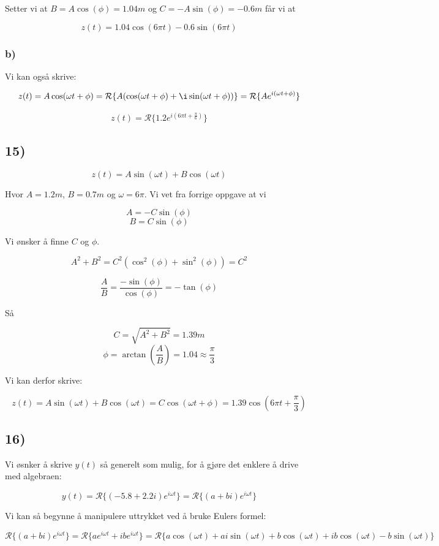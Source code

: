 \documentclass[a4paper,norsk, 10pt]{article}
\begin{document}
Setter vi at $B = A\cos(\phi) = 1.04m$ og $C = -A\sin(\phi) = -0.6m$ får vi at

$$
z(t) = 1.04\cos(6 \pi t) - 0.6\sin(6\pi t)
$$


\subsubsection*{b)}
Vi kan også skrive:

$$
z(t) = A\cos(\omega t + \phi) = \mathcal{R}\{A(\cos(\omega t + \phi) + \i \sin(\omega t + \phi))\} = \mathcal{R}\{Ae^{i(\omega t + \phi)}\}
$$

$$
z(t) = \mathcal{R}\{1.2e^{ i (6\pi t + \frac{\pi}{6})}\}
$$

\subsection*{15)}

$$
z(t) = A\sin(\omega t) + B\cos(\omega t) 
$$

Hvor $A = 1.2m$, $B = 0.7m$ og $\omega = 6\pi$. Vi vet fra forrige oppgave at vi 

$$
A = -C\sin(\phi)
$$
$$
B = C\sin(\phi)
$$

Vi ønsker å finne $C$ og $\phi$.

$$
A^2 + B^2 = C^2(\cos^2(\phi) +\sin^2(\phi)) = C^2 
$$

$$
\frac{A}{B} = \frac{-\sin(\phi)}{\cos(\phi)} = -\tan(\phi)
$$

Så

$$
C = \sqrt{A^2 + B^2} = 1.39m
$$
$$
\phi = \arctan(\frac{A}{B}) = 1.04 \approx \frac{\pi}{3}
$$


Vi kan derfor skrive:

$$
z(t) = A\sin(\omega t) + B\cos(\omega t) = C\cos(\omega t + \phi) = 1.39\cos(6\pi t + \frac{\pi}{3})
$$

\subsection*{16)}
Vi øsnker å skrive $y(t)$ så generelt som mulig, for å gjøre det enklere å drive med algebraen:

$$
y(t) = \mathcal{R}\{ (-5.8 + 2.2i)e^{i\omega t}  \} = \mathcal{R}\{ (a + bi)e^{i\omega t}  \} 
$$

Vi kan så begynne å manipulere uttrykket ved å bruke Eulers formel:

$$
\mathcal{R}\{ (a + bi)e^{i\omega t}  \}  = \mathcal{R}\{ ae^{i\omega t} +ib e^{i\omega t}\} = \mathcal{R}\{ a\cos(\omega t) + ai\sin(\omega t) + b\cos(\omega t) + ib\cos(\omega t) - b\sin(\omega t) \} 
$$
\end{document}
